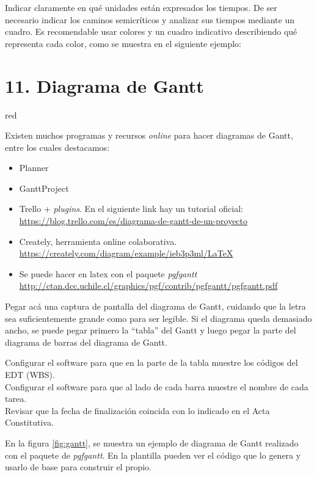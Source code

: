 \documentclass[
11pt, %
]{charter}
\begin{document}
Indicar claramente en qué unidades están expresados los tiempos.
De ser necesario indicar los caminos semicríticos y analizar sus tiempos mediante un cuadro.
Es recomendable usar colores y un cuadro indicativo describiendo qué representa cada color, como se muestra en el siguiente ejemplo:



\section{11. Diagrama de Gantt}
\label{sec:gantt}

\begin{consigna}{red}

Existen muchos programas y recursos \textit{online} para hacer diagramas de Gantt, entre los cuales destacamos:

\begin{itemize}
\item Planner
\item GanttProject
\item Trello + \textit{plugins}. En el siguiente link hay un tutorial oficial: \\ \url{https://blog.trello.com/es/diagrama-de-gantt-de-un-proyecto}
\item Creately, herramienta online colaborativa. \\\url{https://creately.com/diagram/example/ieb3p3ml/LaTeX}
\item Se puede hacer en latex con el paquete \textit{pgfgantt}\\ \url{http://ctan.dcc.uchile.cl/graphics/pgf/contrib/pgfgantt/pgfgantt.pdf}
\end{itemize}

Pegar acá una captura de pantalla del diagrama de Gantt, cuidando que la letra sea suficientemente grande como para ser legible. 
Si el diagrama queda demasiado ancho, se puede pegar primero la ``tabla'' del Gantt y luego pegar la parte del diagrama de barras del diagrama de Gantt.

Configurar el software para que en la parte de la tabla muestre los códigos del EDT (WBS).\\
Configurar el software para que al lado de cada barra muestre el nombre de cada tarea.\\
Revisar que la fecha de finalización coincida con lo indicado en el Acta Constitutiva.

En la figura \ref{fig:gantt}, se muestra un ejemplo de diagrama de Gantt realizado con el paquete de \textit{pgfgantt}. En la plantilla pueden ver el código que lo genera y usarlo de base para construir el propio.


\end{consigna}
\end{document}
